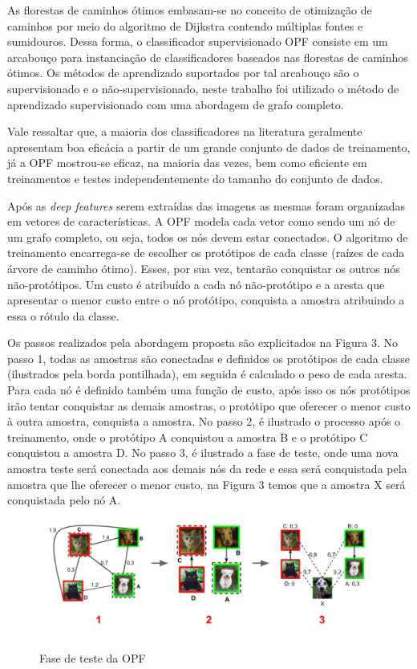 As florestas de caminhos ótimos embasam-se no conceito de otimização de caminhos por meio do algoritmo de Dijkstra
contendo múltiplas fontes e sumidouros. Dessa forma, o classificador supervisionado OPF consiste em um arcabouço para instanciação de classificadores baseados nas florestas de caminhos ótimos. Os métodos de aprendizado suportados por tal arcabouço são o supervisionado e o não-supervisionado, neste trabalho foi utilizado o método de aprendizado supervisionado com uma abordagem de grafo completo.

Vale ressaltar que, a maioria dos classificadores na literatura geralmente apresentam boa eficácia a partir de um grande conjunto de dados de treinamento, já a OPF mostrou-se eficaz, na maioria das vezes, bem como eficiente em treinamentos e testes independentemente do tamanho do conjunto de dados. 

Após as \textit{deep features} serem extraídas das imagens as mesmas foram organizadas em vetores de características. A OPF modela cada vetor como sendo um nó de um grafo completo, ou seja, todos os nós devem estar conectados. O algoritmo de treinamento encarrega-se de escolher os protótipos de cada classe (raízes de cada árvore de caminho ótimo). Esses, por sua vez, tentarão conquistar os outros nós não-protótipos. Um custo é atribuído a cada nó não-protótipo e a aresta que apresentar o menor custo entre o nó protótipo, conquista a amostra atribuindo a essa o rótulo da classe.

Os passos realizados pela abordagem proposta são explicitados na Figura 3. No passo 1, todas as amostras são conectadas e definidos os protótipos de cada classe (ilustrados pela borda pontilhada), em seguida é calculado o peso de cada aresta. Para cada nó é definido também uma função de custo, após isso os nós protótipos irão tentar conquistar as demais amostras, o protótipo que oferecer o menor custo à outra amostra, conquista a amostra. No passo 2, é ilustrado o processo após o treinamento, onde o
protótipo A conquistou a amostra B e o protótipo C conquistou a amostra D. No passo 3, é ilustrado a fase de teste, onde uma nova amostra teste será conectada aos demais nós da rede e essa será conquistada pela amostra que lhe oferecer o menor custo, na
Figura 3 temos que a amostra X será conquistada pelo nó A.

\begin{figure}[!htb]
    \centering
    \caption{Fase de teste da OPF}
    \includegraphics[width=1\textwidth]{./dados/figuras/opf-funcionamento.jpeg}
    \label{fig:figura-FaseTesteOPF}
\end{figure}

